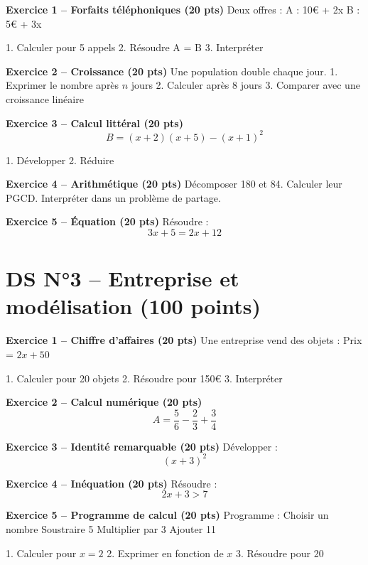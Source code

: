 \documentclass[11pt,a4paper]{article}
\begin{document}
\textbf{Exercice 1 – Forfaits téléphoniques (20 pts)}  
Deux offres :  
A : 10€ + 2x  
B : 5€ + 3x  

1. Calculer pour 5 appels  
2. Résoudre A = B  
3. Interpréter  

\bigskip

\textbf{Exercice 2 – Croissance (20 pts)}  
Une population double chaque jour.  
1. Exprimer le nombre après $n$ jours  
2. Calculer après 8 jours  
3. Comparer avec une croissance linéaire

\bigskip

\textbf{Exercice 3 – Calcul littéral (20 pts)}  
\[
B = (x+2)(x+5) - (x+1)^2
\]

1. Développer  
2. Réduire  

\bigskip

\textbf{Exercice 4 – Arithmétique (20 pts)}  
Décomposer 180 et 84.  
Calculer leur PGCD.  
Interpréter dans un problème de partage.

\bigskip

\textbf{Exercice 5 – Équation (20 pts)}  
Résoudre :
\[
3x + 5 = 2x + 12
\]

\newpage
\section*{DS N°3 – Entreprise et modélisation (100 points)}

\textbf{Exercice 1 – Chiffre d’affaires (20 pts)}  
Une entreprise vend des objets :  
Prix = $2x + 50$

1. Calculer pour 20 objets  
2. Résoudre pour 150€  
3. Interpréter  

\bigskip

\textbf{Exercice 2 – Calcul numérique (20 pts)}  
\[
A = \frac{5}{6} - \frac{2}{3} + \frac{3}{4}
\]

\bigskip

\textbf{Exercice 3 – Identité remarquable (20 pts)}  
Développer :
\[
(x+3)^2
\]

\bigskip

\textbf{Exercice 4 – Inéquation (20 pts)}  
Résoudre :
\[
2x + 3 > 7
\]

\bigskip

\textbf{Exercice 5 – Programme de calcul (20 pts)}  
Programme :  
Choisir un nombre  
Soustraire 5  
Multiplier par 3  
Ajouter 11  

1. Calculer pour $x=2$  
2. Exprimer en fonction de $x$  
3. Résoudre pour 20  
\end{document}
